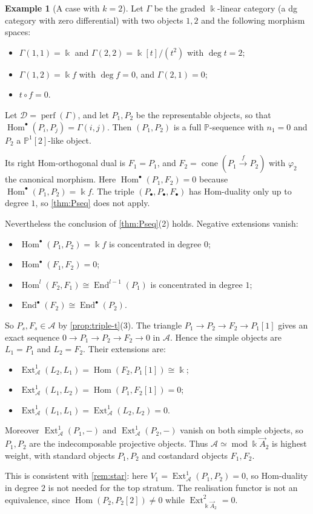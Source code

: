 \documentclass[11pt,reqno]{amsart}
\theoremstyle{plain}
\theoremstyle{definition}
\newtheorem{example}[theorem]{Example}
\theoremstyle{remark}
\newcommand{\kk}{\Bbbk}
\DeclareMathOperator{\Hom}{Hom}
\DeclareMathOperator{\End}{End}
\DeclareMathOperator{\Ext}{Ext}
\DeclareMathOperator{\cone}{cone}
\newcommand{\modd}{\operatorname{mod}}
\newcommand{\Pn}[2]{\mathbb{P}^{#1}[#2]}
\newcommand{\cD}{\mathcal{D}}
\newcommand{\cA}{\mathcal{A}}
\begin{document}
\begin{example}[A case with $k=2$]\label{ex:k2}
Let $\Gamma$ be the graded $\kk$-linear category (a dg category with zero differential) with two objects $1,2$ and the following morphism spaces:
\begin{itemize}
\item $\Gamma(1,1)=\kk$ and $\Gamma(2,2)=\kk[t]/(t^2)$ with $\deg t=2$;
\item $\Gamma(1,2)=\kk f$ with $\deg f=0$, and $\Gamma(2,1)=0$;
\item $t\circ f=0$.
\end{itemize}
Let $\cD=\operatorname{perf}(\Gamma)$, and let $P_1,P_2$ be the representable objects, so that $\Hom^\bullet(P_i,P_j)=\Gamma(i,j)$. Then $(P_1,P_2)$ is a full $\mathbb{P}$-sequence with $n_1=0$ and $P_2$ a $\Pn12$-like object.

Its right Hom-orthogonal dual is $F_1=P_1$, and $F_2=\cone(P_1\xrightarrow{f}P_2)$ with $\varphi_2$ the canonical morphism. Here $\Hom^\bullet(P_1,F_2)=0$ because $\Hom^\bullet(P_1,P_2)=\kk f$. The triple $(P_\bullet,P_\bullet,F_\bullet)$ has Hom-duality only up to degree $1$, so \cref{thm:Pseq} does not apply.

Nevertheless the conclusion of \cref{thm:Pseq}(2) holds. Negative extensions vanish:
\begin{itemize}
\item $\Hom^\bullet(P_1,P_2)=\kk f$ is concentrated in degree $0$;
\item $\Hom^\bullet(F_1,F_2)=0$;
\item $\Hom^l(F_2,F_1)\cong\End^{l-1}(P_1)$ is concentrated in degree $1$;
\item $\End^\bullet(F_2)\cong\End^\bullet(P_2)$.
\end{itemize}
So $P_s,F_s\in\cA$ by \cref{prop:triple-t}(3). The triangle $P_1\to P_2\to F_2\to P_1[1]$ gives an exact sequence $0\to P_1\to P_2\to F_2\to0$ in $\cA$. Hence the simple objects are $L_1=P_1$ and $L_2=F_2$. Their extensions are:
\begin{itemize}
\item $\Ext^1_\cA(L_2,L_1)=\Hom(F_2,P_1[1])\cong\kk$;
\item $\Ext^1_\cA(L_1,L_2)=\Hom(P_1,F_2[1])=0$;
\item $\Ext^1_\cA(L_1,L_1)=\Ext^1_\cA(L_2,L_2)=0$.
\end{itemize}
Moreover $\Ext^1_\cA(P_1,-)$ and $\Ext^1_\cA(P_2,-)$ vanish on both simple objects, so $P_1,P_2$ are the indecomposable projective objects. Thus $\cA\simeq\modd\kk\vec A_2$ is highest weight, with standard objects $P_1,P_2$ and costandard objects $F_1,F_2$.

This is consistent with \cref{rem:star}: here $V_1=\Ext^1_\cA(P_1,P_2)=0$, so Hom-duality in degree $2$ is not needed for the top stratum. The realisation functor is not an equivalence, since $\Hom(P_2,P_2[2])\ne0$ while $\Ext^2_{\kk\vec A_2}=0$.
\end{example}
\end{document}
